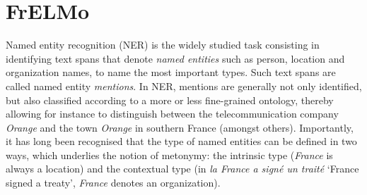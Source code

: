 
\section{FrELMo}
\label{sec:intro}

Named entity recognition (NER) is the widely studied task consisting in identifying text spans that denote \emph{named entities} such as person, location and organization names, to name the most important types. Such text spans are called named entity \emph{mentions}. In NER, mentions are generally not only identified, but also classified according to a more or less fine-grained ontology, thereby allowing for instance to distinguish between the telecommunication company \emph{Orange} and the town \emph{Orange} in southern France (amongst others). Importantly, it has long been recognised that the type of named entities can be defined in two ways, which underlies the notion of metonymy: the intrinsic type (\emph{France} is always a location) and the contextual type (in \emph{la France a signé un traité} `France signed a treaty', \emph{France} denotes an organization).


